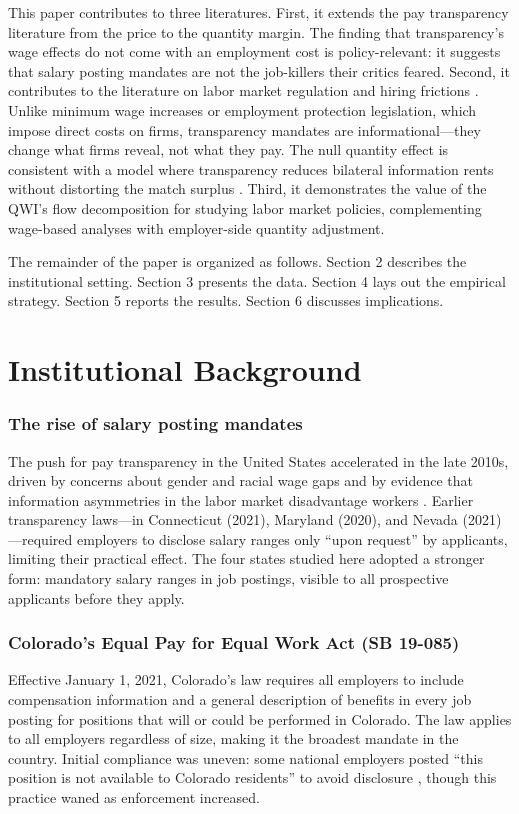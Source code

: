 \documentclass[12pt]{article}
\begin{document}
This paper contributes to three literatures. First, it extends the pay transparency literature \citep{cullen2024equilibrium, duchini2020pay, baker2023pay, bennedsen2022firms} from the price to the quantity margin. The finding that transparency's wage effects do not come with an employment cost is policy-relevant: it suggests that salary posting mandates are not the job-killers their critics feared. Second, it contributes to the literature on labor market regulation and hiring frictions \citep{autor2003rise, djankov2002regulation}. Unlike minimum wage increases or employment protection legislation, which impose direct costs on firms, transparency mandates are informational---they change what firms reveal, not what they pay. The null quantity effect is consistent with a model where transparency reduces bilateral information rents without distorting the match surplus \citep{board2012relational}. Third, it demonstrates the value of the QWI's flow decomposition for studying labor market policies, complementing wage-based analyses with employer-side quantity adjustment.

The remainder of the paper is organized as follows. Section 2 describes the institutional setting. Section 3 presents the data. Section 4 lays out the empirical strategy. Section 5 reports the results. Section 6 discusses implications.


\section{Institutional Background}

\subsubsection*{The rise of salary posting mandates} The push for pay transparency in the United States accelerated in the late 2010s, driven by concerns about gender and racial wage gaps and by evidence that information asymmetries in the labor market disadvantage workers \citep{cullen2024equilibrium}. Earlier transparency laws---in Connecticut (2021), Maryland (2020), and Nevada (2021)---required employers to disclose salary ranges only ``upon request'' by applicants, limiting their practical effect. The four states studied here adopted a stronger form: mandatory salary ranges in job postings, visible to all prospective applicants before they apply.

\subsubsection*{Colorado's Equal Pay for Equal Work Act (SB 19-085)} Effective January 1, 2021, Colorado's law requires all employers to include compensation information and a general description of benefits in every job posting for positions that will or could be performed in Colorado. The law applies to all employers regardless of size, making it the broadest mandate in the country. Initial compliance was uneven: some national employers posted ``this position is not available to Colorado residents'' to avoid disclosure \citep{cullen2024equilibrium}, though this practice waned as enforcement increased.
\end{document}

